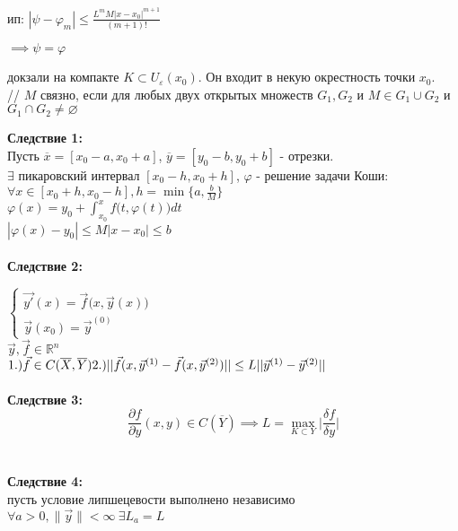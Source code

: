 \documentclass[12pt, a4paper]{article}
\begin{document}
ип: $| \psi - \varphi_m| \le \frac{L^m M |x-x_0|^{m+1}}{(m+1)!}$

$\implies \psi = \varphi$

докзали на компакте $K \subset U_\varepsilon(x_0)$. Он входит в некую окрестность точки $x_0$.\\
// $M$ связно, если для любых двух открытых множеств $G_1, G_2$ и $M \in G_1 \cup G_2$ и $G_1 \cap G_2 \neq \varnothing$ 

\textbf{Следствие 1:}\\ 
Пусть $\overline{x} = [x_0-a, x_0+a]$, $\overline{y} = [y_0-b, y_0+b]$ - отрезки.\\
$\exists$ пикаровский интервал $[x_0 - h, x_0 + h]$, $\varphi $ - решение задачи Коши: \\
$\forall x \in [x_0 +h, x_0-h], h = \min\{a, 
\frac{b}{M}\}$ \\
$\varphi(x) = y_0 + \int^x_{x_0}f\big(t, \varphi(t)\big)dt$\\

$|\varphi(x) - y_0| \le M|x-x_0| \le b$\\\\

\textbf{Следствие 2:}

$
\begin{cases}
\vec{y'}(x) = \vec{f}\big(x, \vec{y}(x)\big)\\
\vec{y}(x_0) = \vec{y}^{(0)}

\end{cases}$ \\

$\vec{y}, \vec{f} \in \mathbb{R}^n$ \\

$1.) \vec{f} \in C(\overline{X}, \overline{Y})\\
 2.) || \vec{f}(x, \vec{y}^{(1)} - \vec{f}(x, \vec{y}^{(2)}) || \le L|| \vec{y}^{(1)} - \vec{y}^{(2)} ||$\\\\

\textbf{Следствие 3:}\\
$$\frac{\partial f}{\partial y}(x, y) \in C(\overline{Y}) \implies L = \max_{K \subset Y} \Big|\frac{\delta f}{\delta y}\Big|$$\\\\
\textbf{Следствие 4:}\\
пусть условие липшецевости выполнено независимо\\

$\forall a >0, \|\vec{y}\| < \infty \ \exists L_a = L$\\
\end{document}
